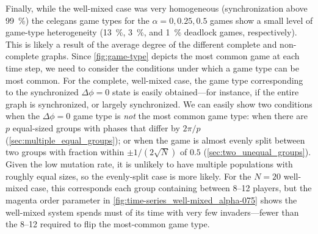 \documentclass[pdflatex,lineno,referee,sn-nature]{sn-jnl}
\begin{document}
Finally, while the  well-mixed case
was very homogeneous (synchronization above \SI{99}{\percent})
the
 \gls{celegans} game types
for the $\alpha = 0,0.25,0.5$ games
show a small level of game-type heterogeneity
(\SI{13}{\percent}, \SI{3}{\percent}, and \SI{1}{\percent} deadlock games,
respectively).
This is likely a result of the average degree
of the different complete and non-complete graphs.
Since \cref{fig:game-type} depicts the most common game at each time step,
we need to consider the conditions under which a game type can be most common.
For the complete, well-mixed case, the game type corresponding
to the synchronized $\Delta \phi = 0$ state
is easily obtained---for instance, if the entire graph is synchronized,
or largely synchronized.
We can easily show two conditions when the $\Delta \phi = 0$ game type
is \emph{not} the most common game type:
when there are $p$ equal-sized groups
with phases that differ by $2 \pi/p$ (\cf \cref{sec:multiple_equal_groups});
or when the game is almost evenly split between two groups
with fraction within $\pm 1/(2 \sqrt{N})$ of $0.5$
(\cf \cref{sec:two_unequal_groups}).
Given the low mutation rate, it is unlikely to have
multiple populations with roughly equal sizes,
so the evenly-split case is more likely.
For the $N = 20$ well-mixed case, this corresponds
each group containing between \numrange{8}{12} players,
but the magenta order parameter in \cref{fig:time-series_well-mixed_alpha-075}
shows the well-mixed system spends must of its time with very few invaders---fewer
than the \numrange{8}{12} required to flip the most-common game type.
\end{document}
